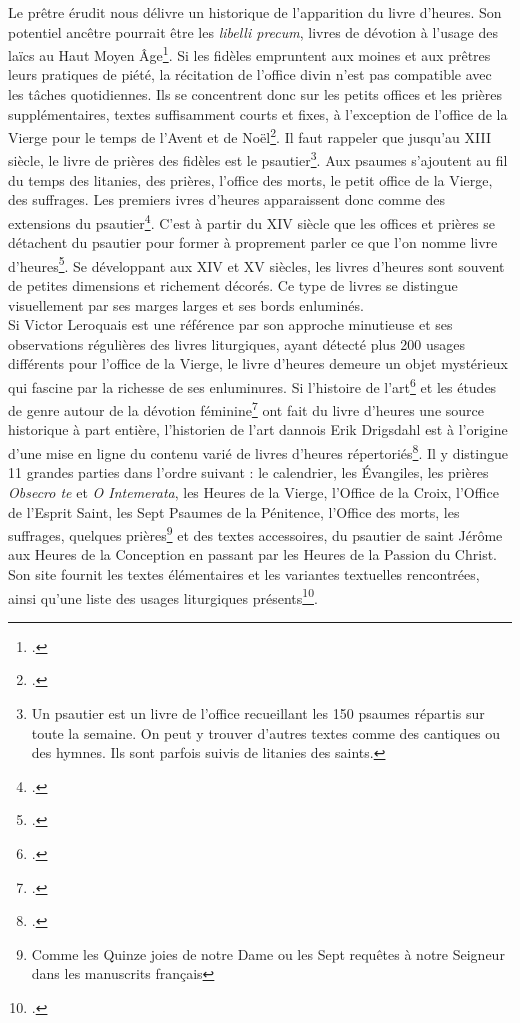 \documentclass[a4paper,12pt,twoside]{book}
\begin{document}
Le prêtre érudit nous délivre un historique de l'apparition du livre d'heures. Son potentiel ancêtre pourrait être les \textit{libelli precum}, livres de dévotion à l'usage des laïcs au Haut Moyen Âge\footcite[p. IX]{Leroquais_notices}. Si les fidèles empruntent aux moines et aux prêtres leurs pratiques de piété, la récitation de l’office divin n’est pas compatible avec les tâches quotidiennes. Ils se concentrent donc sur les petits offices et les prières supplémentaires, textes suffisamment courts et fixes, à l’exception de l’office de la Vierge pour le temps de l’Avent et de Noël\footcite[p. X]{Leroquais_notices}. Il faut rappeler que jusqu'au \textsc{XIII} siècle, le livre de prières des fidèles est le psautier\footnote{Un psautier est un livre de l'office recueillant les 150 psaumes répartis sur toute la semaine. On peut y trouver d'autres textes comme des cantiques ou des hymnes. Ils sont parfois suivis de litanies des saints.}. Aux psaumes s'ajoutent au fil du temps des litanies, des prières, l’office des morts, le petit office de la Vierge, des suffrages. Les premiers ivres d'heures apparaissent donc comme des extensions du psautier\footcite[p. X]{Leroquais_notices}. C'est à partir du \textsc{XIV} siècle que les offices et prières se détachent du psautier pour former à proprement parler ce que l'on nomme livre d'heures\footcite[p. XII]{Leroquais_notices}. Se développant aux \textsc{XIV} et \textsc{XV} siècles, les livres d'heures sont souvent de petites dimensions et richement décorés. Ce type de livres se distingue visuellement par ses marges larges et ses bords enluminés.\\

Si Victor Leroquais est une référence par son approche minutieuse et ses observations régulières des livres liturgiques, ayant détecté plus 200 usages différents pour l’office de la Vierge, le livre d'heures demeure un objet mystérieux qui fascine par la richesse de ses enluminures. Si l'histoire de l'art\footcite{livres_enllumines} et les études de genre autour de la dévotion féminine\footcite{Women_Books_Hours} ont fait du livre d'heures une source historique à part entière, l'historien de l'art dannois Erik Drigsdahl est à l'origine d'une mise en ligne du contenu varié de livres d'heures répertoriés\footcite{Intro_Book_of_H}. Il y distingue 11 grandes parties dans l'ordre suivant : le calendrier, les Évangiles, les prières \textit{Obsecro te} et \textit{O Intemerata}, les Heures de la Vierge, l'Office de la Croix, l'Office de l'Esprit Saint, les Sept Psaumes de la Pénitence, l'Office des morts, les suffrages, quelques prières\footnote{Comme les Quinze joies de notre Dame ou les Sept requêtes à notre Seigneur dans les manuscrits français} et des textes accessoires, du psautier de saint Jérôme aux Heures de la Conception en passant par les Heures de la Passion du Christ. Son site fournit les textes élémentaires et les variantes textuelles rencontrées, ainsi qu'une liste des usages liturgiques présents\footcite{Usages_HVierge}. 
\end{document}
